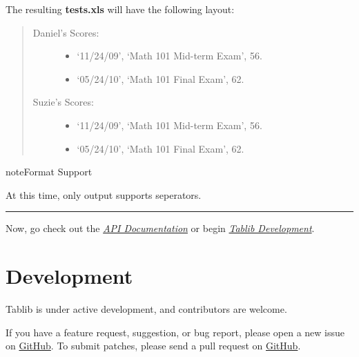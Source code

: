 \documentclass[a4paper,12pt,english]{sphinxmanual}
\begin{document}
The resulting \textbf{tests.xls} will have the following layout:
\begin{quote}
\begin{description}
\item[{Daniel's Scores:}] \leavevmode\begin{itemize}
\item {} 
`11/24/09', `Math 101 Mid-term Exam', 56.

\item {} 
`05/24/10', `Math 101 Final Exam', 62.

\end{itemize}

\item[{Suzie's Scores:}] \leavevmode\begin{itemize}
\item {} 
`11/24/09', `Math 101 Mid-term Exam', 56.

\item {} 
`05/24/10', `Math 101 Final Exam', 62.

\end{itemize}

\end{description}
\end{quote}

\begin{notice}{note}{Format Support}

At this time, only {\hyperref[api:tablib.Dataset.xls]{}} output supports seperators.
\end{notice}


\bigskip\hrule{}\bigskip


Now, go check out the {\hyperref[api:api]{\emph{API Documentation}}} or begin {\hyperref[development:development]{\emph{Tablib Development}}}.


\chapter{Development}
\label{development:development}\label{development::doc}\label{development:id1}
Tablib is under active development, and contributors are welcome.

If you have a feature request, suggestion, or bug report, please open a new issue on \href{http://github.com/kennethreitz/tablib/}{GitHub}. To submit patches, please send a pull request on \href{http://github.com/kennethreitz/tablib/}{GitHub}.
\end{document}
